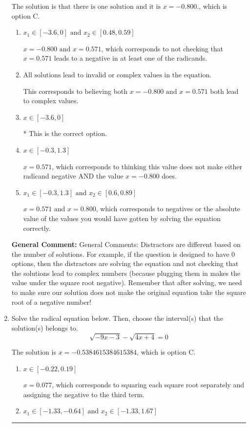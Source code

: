 \documentclass{extbook}[14pt]
\newcommand{\litem}[1]{\item #1

\rule{\textwidth}{0.4pt}}
\begin{document}
\begin{enumerate}
{The solution is \( \text{that there is one solution and it is } x = -0.800. \), which is option C.\begin{enumerate}[label=\Alph*.]
\item \( x_1 \in [-3.6, 0] \text{ and } x_2 \in [0.48,0.59] \)

$x = -0.800 \text{ and } x = 0.571$, which corresponds to not checking that $x = 0.571$ leads to a negative in at least one of the radicands.
\item \( \text{All solutions lead to invalid or complex values in the equation.} \)

This corresponds to believing both $x = -0.800 \text{ and } x = 0.571$ both lead to complex values.
\item \( x \in [-3.6,0] \)

* This is the correct option.
\item \( x \in [-0.3,1.3] \)

$x = 0.571$, which corresponds to thinking this value does not make either radicand negative AND the value $x = -0.800$ does.
\item \( x_1 \in [-0.3, 1.3] \text{ and } x_2 \in [0.6,0.89] \)

$x = 0.571 \text{ and } x = 0.800$, which corresponds to negatives or the absolute value of the values you would have gotten by solving the equation correctly.
\end{enumerate}

\textbf{General Comment:} General Comments: Distractors are different based on the number of solutions. For example, if the question is designed to have 0 options, then the distractors are solving the equation and not checking that the solutions lead to complex numbers (because plugging them in makes the value under the square root negative). Remember that after solving, we need to make sure our solution does not make the original equation take the square root of a negative number!
}
\litem{
Solve the radical equation below. Then, choose the interval(s) that the solution(s) belongs to.
\[ \sqrt{-9 x - 3} - \sqrt{4 x + 4} = 0 \]

The solution is \( x = -0.5384615384615384 \), which is option C.\begin{enumerate}[label=\Alph*.]
\item \( x \in [-0.22,0.19] \)

$x = 0.077$, which corresponds to squaring each square root separately and assigning the negative to the third term.
\item \( x_1 \in [-1.33, -0.64] \text{ and } x_2 \in [-1.33,1.67] \)


\end{enumerate}}
\end{enumerate}
\end{document}
